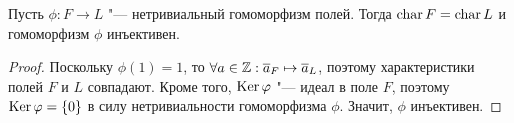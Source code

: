 \begin{proposition}
	Пусть $\phi: F \to L$ "--- нетривиальный гомоморфизм полей. Тогда $\operatorname{char}{F} = \operatorname{char}{L}$ и гомоморфизм $\phi$ инъективен.
\end{proposition}

\begin{proof}
	Поскольку $\phi(1) = 1$, то $\forall a \in \mathbb{Z}: \overline{a}_F \mapsto \overline{a}_L$, поэтому характеристики полей $F$ и $L$ совпадают. Кроме того, $\operatorname{Ker}\varphi$ "--- идеал в поле $F$, поэтому $\operatorname{Ker}\varphi = \{0\}$ в силу нетривиальности гомоморфизма $\phi$. Значит, $\phi$ инъективен.
\end{proof}